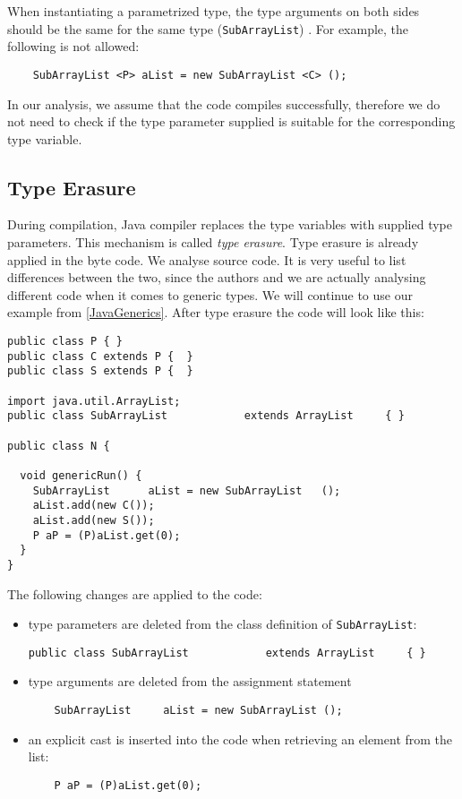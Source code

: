 \documentclass{uvamscse}
\begin{document}
When instantiating a parametrized type, the type arguments on both sides should be the same for the same type (\texttt{SubArrayList}) . For example, the following is not allowed: 
\begin{verbatim}
    SubArrayList <P> aList = new SubArrayList <C> ();
\end{verbatim}

In our analysis, we assume that the code compiles successfully, therefore we do not need to check if the type parameter supplied  is suitable for the corresponding type variable.

\subsection{Type Erasure}
During compilation, Java compiler replaces the type variables with supplied type parameters. This mechanism is called \emph{type erasure}. Type erasure is already applied in the byte code. We analyse source code. It is very useful to list differences between the two, since the authors and we are actually analysing different code when it comes to generic types. We will continue to use our example from \ref{JavaGenerics}. After type erasure the code will look like this:
\begin{verbatim}
public class P { }
public class C extends P {  }
public class S extends P {  }

import java.util.ArrayList;
public class SubArrayList            extends ArrayList     { }

public class N {
  
  void genericRun() {
   	SubArrayList      aList = new SubArrayList   ();
    aList.add(new C());
    aList.add(new S());
    P aP = (P)aList.get(0);
  }
}
\end{verbatim}

The following changes are applied to the code:
\begin{itemize}
\item type parameters are deleted from the class definition of \texttt{SubArrayList}:
\begin{verbatim}
public class SubArrayList            extends ArrayList     { }
\end{verbatim}
\item type arguments are deleted from the assignment statement 
\begin{verbatim}
    SubArrayList     aList = new SubArrayList ();
\end{verbatim}
\item an explicit cast is inserted into the code when retrieving an element from the list:
\begin{verbatim}
    P aP = (P)aList.get(0);
\end{verbatim}
\end{itemize}
\end{document}
